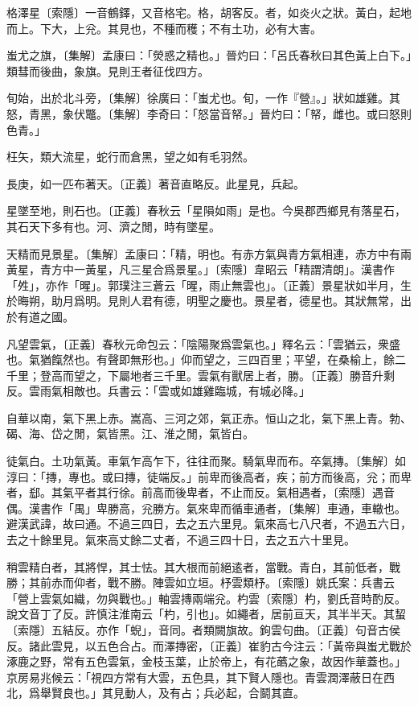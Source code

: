 格澤星〔索隱〕一音鶴鐸，又音格宅。格，胡客反。者，如炎火之狀。黃白，起地而上。下大，上兊。其見也，不種而穫；不有土功，必有大害。

蚩尤之旗，〔集解〕孟康曰：「熒惑之精也。」晉灼曰：「呂氏春秋曰其色黃上白下。」類彗而後曲，象旗。見則王者征伐四方。

旬始，出於北斗旁，〔集解〕徐廣曰：「蚩尤也。旬，一作『營』。」狀如雄雞。其怒，青黑，象伏鼈。〔集解〕李奇曰：「怒當音帑。」晉灼曰：「帑，雌也。或曰怒則色青。」

枉矢，類大流星，蛇行而倉黑，望之如有毛羽然。

長庚，如一匹布著天。〔正義〕著音直略反。此星見，兵起。

星墜至地，則石也。〔正義〕春秋云「星隕如雨」是也。今吳郡西鄉見有落星石，其石天下多有也。河、濟之閒，時有墜星。

天精而見景星。〔集解〕孟康曰：「精，明也。有赤方氣與青方氣相連，赤方中有兩黃星，青方中一黃星，凡三星合爲景星。」〔索隱〕韋昭云「精謂清朗」。漢書作「夝」，亦作「暒」。郭璞注三蒼云「暒，雨止無雲也」。〔正義〕景星狀如半月，生於晦朔，助月爲明。見則人君有德，明聖之慶也。景星者，德星也。其狀無常，出於有道之國。

凡望雲氣，〔正義〕春秋元命包云：「陰陽聚爲雲氣也。」釋名云：「雲猶云，衆盛也。氣猶餼然也。有聲即無形也。」仰而望之，三四百里；平望，在桑榆上，餘二千里；登高而望之，下屬地者三千里。雲氣有獸居上者，勝。〔正義〕勝音升剩反。雲雨氣相敵也。兵書云：「雲或如雄雞臨城，有城必降。」

自華以南，氣下黑上赤。嵩高、三河之郊，氣正赤。恒山之北，氣下黑上青。勃、碣、海、岱之閒，氣皆黑。江、淮之閒，氣皆白。

徒氣白。土功氣黃。車氣乍高乍下，往往而聚。騎氣卑而布。卒氣摶。〔集解〕如淳曰：「摶，專也。或曰摶，徒端反。」前卑而後高者，疾；前方而後高，兊；而卑者，郄。其氣平者其行徐。前高而後卑者，不止而反。氣相遇者，〔索隱〕遇音偶。漢書作「禺」卑勝高，兊勝方。氣來卑而循車通者，〔集解〕車通，車轍也。避漢武諱，故曰通。不過三四日，去之五六里見。氣來高七八尺者，不過五六日，去之十餘里見。氣來高丈餘二丈者，不過三四十日，去之五六十里見。

稍雲精白者，其將悍，其士怯。其大根而前絕逺者，當戰。青白，其前低者，戰勝；其前赤而仰者，戰不勝。陣雲如立垣。杼雲類杼。〔索隱〕姚氏案：兵書云「營上雲氣如織，勿與戰也。」軸雲摶兩端兊。杓雲〔索隱〕杓，劉氏音時酌反。說文音丁了反。許慎注淮南云「杓，引也」。如繩者，居前亘天，其半半天。其蛪〔索隱〕五結反。亦作「蜺」，音同。者類闕旗故。鉤雲句曲。〔正義〕句音古侯反。諸此雲見，以五色合占。而澤摶密，〔正義〕崔豹古今注云：「黃帝與蚩尤戰於涿鹿之野，常有五色雲氣，金枝玉葉，止於帝上，有花蘤之象，故因作華蓋也。」京房易兆候云：「視四方常有大雲，五色具，其下賢人隱也。青雲潤澤蔽日在西北，爲舉賢良也。」其見動人，及有占；兵必起，合鬬其直。

